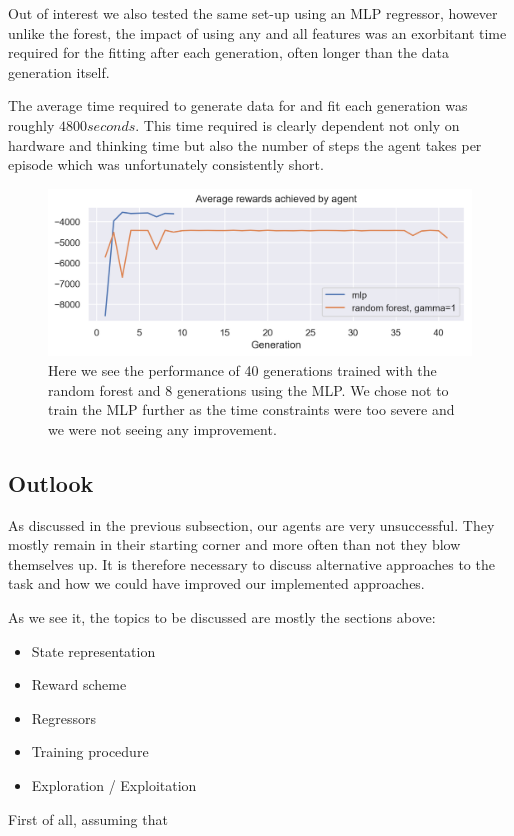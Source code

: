 Out of interest we also tested the same set-up using an MLP regressor, however unlike the forest, the impact of using any and all features was an exorbitant time required for the fitting after each generation, often longer than the data generation itself.

The average time required to generate data for and fit each generation was roughly $4800 seconds$. This time required is clearly dependent not only on hardware and thinking time but also the number of steps the agent takes per episode which was unfortunately consistently short.

\begin{figure}[h]
\centering
	\includegraphics[width=\linewidth]{images/mlp_vs_forest_gamma_1.png}
	\caption{Here we see the performance of 40 generations trained with the random forest and 8 generations using the MLP. We chose not to train the MLP further as the time constraints were too severe and we were not seeing any improvement.}
	\label{mlp_vs_forest_gamma_1.0}
\end{figure}



\subsection{Outlook}
As discussed in the previous subsection, our agents are very unsuccessful. They mostly remain in their starting corner and more often than not they blow themselves up. It is therefore necessary to discuss alternative approaches to the task and how we could have improved our implemented approaches.\par


As we see it, the topics to be discussed are mostly the sections above:
\begin{itemize}
	\item State representation
	\item Reward scheme
	\item Regressors
	\item Training procedure
	\item Exploration / Exploitation
\end{itemize}
First of all, assuming that 